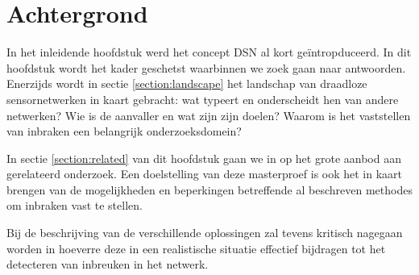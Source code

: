 
\chapter{Achtergrond}
\label{chapter:achtergrond}

In het inleidende hoofdstuk werd het concept DSN al kort ge\"intropduceerd. In
dit hoofdstuk wordt het kader geschetst waarbinnen we zoek gaan naar
antwoorden. Enerzijds wordt in sectie \ref{section:landscape} het landschap van
draadloze sensornetwerken in kaart gebracht: wat typeert en onderscheidt hen van
andere netwerken? Wie is de aanvaller en wat zijn zijn doelen? Waarom is het
vaststellen van inbraken een belangrijk onderzoeksdomein?

In sectie \ref{section:related} van dit hoofdstuk gaan we in op het grote
aanbod aan gerelateerd onderzoek. Een doelstelling van deze masterproef is ook
het in kaart brengen van de mogelijkheden en beperkingen betreffende al
beschreven methodes om inbraken vast te stellen.

Bij de beschrijving van de verschillende oplossingen zal tevens kritisch
nagegaan worden in hoeverre deze in een realistische situatie effectief
bijdragen tot het detecteren van inbreuken in het netwerk.



